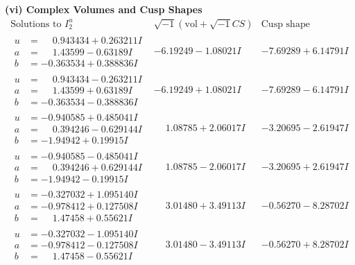 \documentclass[1p]{elsarticle_modified}
\theoremstyle{definition}
\newcommand{\I}{\sqrt{-1}}
\begin{document}
\newpage\flushleft \textbf{(vi) Complex Volumes and Cusp Shapes}
$$\begin{array}{c|c|c}  
\text{Solutions to }I^u_{2}& \I (\text{vol} + \sqrt{-1}CS) & \text{Cusp shape}\\
 \hline 
\begin{aligned}
u &= \phantom{-}0.943434 + 0.263211 I \\
a &= \phantom{-}1.43599 - 0.63189 I \\
b &= -0.363534 + 0.388836 I\end{aligned}
 & -6.19249 - 1.08021 I & -7.69289 + 6.14791 I \\ \hline\begin{aligned}
u &= \phantom{-}0.943434 - 0.263211 I \\
a &= \phantom{-}1.43599 + 0.63189 I \\
b &= -0.363534 - 0.388836 I\end{aligned}
 & -6.19249 + 1.08021 I & -7.69289 - 6.14791 I \\ \hline\begin{aligned}
u &= -0.940585 + 0.485041 I \\
a &= \phantom{-}0.394246 - 0.629144 I \\
b &= -1.94942 + 0.19915 I\end{aligned}
 & \phantom{-}1.08785 + 2.06017 I & -3.20695 - 2.61947 I \\ \hline\begin{aligned}
u &= -0.940585 - 0.485041 I \\
a &= \phantom{-}0.394246 + 0.629144 I \\
b &= -1.94942 - 0.19915 I\end{aligned}
 & \phantom{-}1.08785 - 2.06017 I & -3.20695 + 2.61947 I \\ \hline\begin{aligned}
u &= -0.327032 + 1.095140 I \\
a &= -0.978412 + 0.127508 I \\
b &= \phantom{-}1.47458 + 0.55621 I\end{aligned}
 & \phantom{-}3.01480 + 3.49113 I & -0.56270 - 8.28702 I \\ \hline\begin{aligned}
u &= -0.327032 - 1.095140 I \\
a &= -0.978412 - 0.127508 I \\
b &= \phantom{-}1.47458 - 0.55621 I\end{aligned}
 & \phantom{-}3.01480 - 3.49113 I & -0.56270 + 8.28702 I \\ \hline\begin{aligned}

\end{aligned}
\end{array}$$
\end{document}
